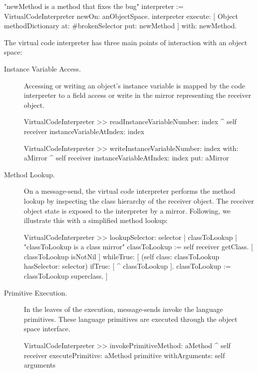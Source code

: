 \begin{code}
"newMethod is a method that fixes the bug"
interpreter := VirtualCodeInterpreter newOn: anObjectSpace.
interpreter
	execute: [ Object methodDictionary at: #brokenSelector put: newMethod ]
	with: newMethod.
\end{code}

The virtual code interpreter has three main points of interaction with an object space:

\begin{description}
\item[Instance Variable Access.] Accessing or writing an object's instance variable is mapped by the code interpreter to a field access or write in the mirror representing the receiver object.

\begin{code}
VirtualCodeInterpreter >> readInstanceVariableNumber: index
    ^ self receiver instanceVariableAtIndex: index
    
VirtualCodeInterpreter >> writeInstanceVariableNumber: index with: aMirror
    ^ self receiver instanceVariableAtIndex: index put: aMirror
\end{code}

\item[Method Lookup.] On a message-send, the virtual code interpreter performs the method lookup by inspecting the class hierarchy of the receiver object. The receiver object state is exposed to the interpreter by a mirror. Following, we illustrate this with a simplified method lookup:

\begin{code}
VirtualCodeInterpreter >> lookupSelector: selector
    | classToLookup |
    "classToLookup is a class mirror"
    classToLookup := self receiver getClass.
    [ classToLookup isNotNil ] whileTrue: [
        (self class: classToLookup hasSelector: selector)
        	    ifTrue: [ ^ classToLookup ].
	classToLookup := classToLookup superclass.
    ]
\end{code}

\item[Primitive Execution.] In the leaves of the execution, message-sends invoke the language primitives. These language primitives are executed through the object space interface.

\begin{code}
VirtualCodeInterpreter >> invokePrimitiveMethod: aMethod
    ^ self receiver
         executePrimitive: aMethod primitive
         withArguments: self arguments
\end{code}

\end{description}

